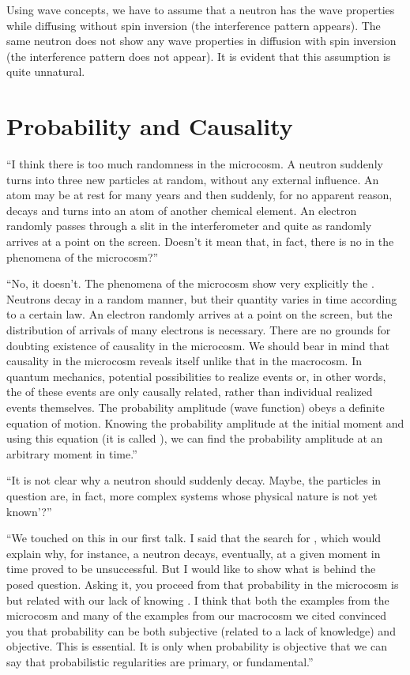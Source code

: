 Using wave concepts, we have to assume that a neutron has the wave
properties while diffusing without spin inversion (the interference pattern
appears). The same neutron does not show any wave properties in
diffusion with spin inversion (the interference pattern does not appear).
It is evident that this assumption is quite unnatural.

\section{Probability and Causality }

\begin{dialogue}

\rdr ``I think there is too much randomness in the microcosm.
A neutron suddenly turns into three new particles at random, without
any external influence. An atom may be at rest for many years and
then suddenly, for no apparent reason, decays and turns into an atom
of another chemical element. An electron randomly passes through
a slit in the interferometer and quite as randomly arrives at a point
on the screen. Doesn't it mean that, in fact, there is no  in the phenomena of the microcosm?''

\athr ``No, it doesn't. The phenomena of the microcosm show
very explicitly the . Neutrons decay in a random manner, but their quantity varies in time
according to a certain law. An electron randomly arrives at a point on
the screen, but the distribution of arrivals of many electrons is
necessary. There are no grounds for doubting existence of causality in
the microcosm. We should bear in mind that causality in the
microcosm reveals itself unlike that in the macrocosm. In quantum
mechanics, potential possibilities to realize events or, in other words,
the  of these events are only causally related, rather than individual realized events themselves. The probability amplitude (wave function) obeys a definite equation of motion. Knowing the
probability amplitude at the initial moment and using this equation (it
is called ), we can find the probability amplitude at an arbitrary moment in time.''

\rdr ``It is not clear why a neutron should suddenly decay.
Maybe, the particles in question are, in fact, more complex systems
whose physical nature is not yet known'?''

\athr ``We touched on this in our first talk. I said that the search
for , which would explain why, for instance,
a neutron decays, eventually, at a given moment in time proved to be
unsuccessful. But I would like to show what is behind the posed
question. Asking it, you proceed from that probability in the
microcosm is  but related with our lack of knowing . I think that both the examples from the microcosm and many of the examples from our macrocosm we cited convinced you that probability can be both subjective (related to a lack of knowledge) and objective. This is essential. It is only when probability is objective that we can say that probabilistic regularities are primary, or fundamental.''


\end{dialogue}
